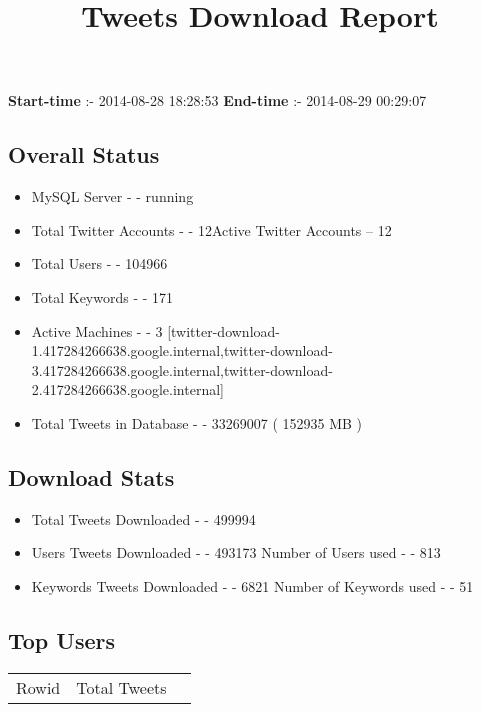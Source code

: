 \documentclass{article}\usepackage[T1]{fontenc}
\begin{document}
\title{\textbf{Tweets Download Report}}
               \date{}
                \maketitle
               \centerline{\textbf{Start-time} :- 2014-08-28 18:28:53 \hspace{40pt} \textbf{End-time} :- 2014-08-29 00:29:07}               \subsection*{Overall Status}                \begin{itemize}                \item MySQL Server - - running               \item Total Twitter Accounts - - 12\newline Active Twitter Accounts -- 12               \item Total Users - - 104966               \item Total Keywords - - 171               \item Active Machines - - 3 [twitter-download-1.417284266638.google.internal,twitter-download-3.417284266638.google.internal,twitter-download-2.417284266638.google.internal]               \item Total Tweets in Database - - 33269007 ( 152935 MB )               \end{itemize}               \subsection*{Download Stats}                \begin{itemize}                \item Total Tweets Downloaded - - 499994               \item Users Tweets Downloaded - - 493173 \newline Number of Users used - - 813               \item Keywords Tweets Downloaded - - 6821 \newline Number of Keywords used - - 51              \end{itemize}              \subsection*{Top Users}\begin{tabular}{|c|c|c|}         \hline         Rowid & Total Tweets \\ 

\end{tabular}
\end{document}
